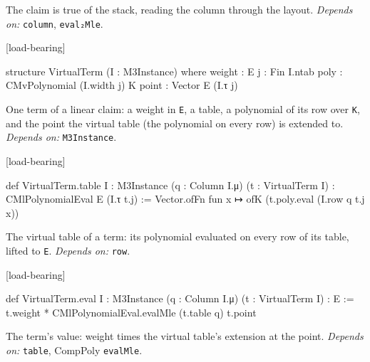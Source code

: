 
The claim is true of the stack, reading the column through the layout. \emph{Depends on:} \texttt{column}, \texttt{eval₂Mle}.

\par\medskip\noindent\textbf{}\hfill\textsf{\small [load-bearing]}\par\nopagebreak

\begin{leancode}
structure VirtualTerm (I : M3Instance) where
  weight : E
  j : Fin I.ntab
  poly : CMvPolynomial (I.width j) K
  point : Vector E (I.τ j)
\end{leancode}


One term of a linear claim: a weight in \texttt{E}, a table, a polynomial of its row over \texttt{K}, and the point the virtual table (the polynomial on every row) is extended to. \emph{Depends on:} \texttt{M3Instance}.

\par\medskip\noindent\textbf{}\hfill\textsf{\small [load-bearing]}\par\nopagebreak

\begin{leancode}
def VirtualTerm.table {I : M3Instance} (q : Column I.μ) (t : VirtualTerm I) :
    CMlPolynomialEval E (I.τ t.j) :=
  Vector.ofFn fun x ↦ ofK (t.poly.eval (I.row q t.j x))
\end{leancode}


The virtual table of a term: its polynomial evaluated on every row of its table, lifted to \texttt{E}. \emph{Depends on:} \texttt{row}.

\par\medskip\noindent\textbf{}\hfill\textsf{\small [load-bearing]}\par\nopagebreak

\begin{leancode}
def VirtualTerm.eval {I : M3Instance} (q : Column I.μ) (t : VirtualTerm I) : E :=
  t.weight * CMlPolynomialEval.evalMle (t.table q) t.point
\end{leancode}


The term's value: weight times the virtual table's extension at the point. \emph{Depends on:} \texttt{table}, CompPoly \texttt{evalMle}.

